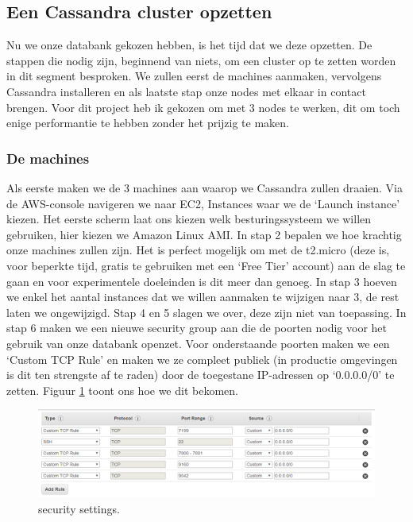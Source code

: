 \documentclass{article}
\begin{document}
	\subsection{Een Cassandra cluster opzetten}
	Nu we onze databank gekozen hebben, is het tijd dat we deze opzetten. 
	De stappen die nodig zijn, beginnend van niets, om een cluster op te zetten worden in dit segment besproken. 
	We zullen eerst de machines aanmaken, vervolgens Cassandra installeren en als laatste stap onze nodes met elkaar in contact brengen.
	Voor dit project heb ik gekozen om met 3 nodes te werken, dit om toch enige performantie te hebben zonder het prijzig te maken.
	\subsubsection{De machines}
	Als eerste maken we de 3 machines aan waarop we Cassandra zullen draaien. 
	Via de AWS-console navigeren we naar EC2, Instances waar we de ‘Launch instance’ kiezen.
	Het eerste scherm laat ons kiezen welk besturingssysteem we willen gebruiken, hier kiezen we Amazon Linux AMI. 
	In stap 2 bepalen we hoe krachtig onze machines zullen zijn. Het is perfect mogelijk om met de t2.micro 
	(deze is, voor beperkte tijd, gratis te gebruiken met een ‘Free Tier’ account) aan de slag te gaan en voor experimentele doeleinden is dit meer dan genoeg.
	In stap 3 hoeven we enkel het aantal instances dat we willen aanmaken te wijzigen naar 3, 
	de rest laten we ongewijzigd. Stap 4 en 5 slagen we over, deze zijn niet van toepassing. 
	In stap 6 maken we een nieuwe security group aan die de poorten nodig voor het gebruik van onze databank openzet. 
	Voor onderstaande poorten maken we een ‘Custom TCP Rule’ en maken we ze compleet publiek (in productie omgevingen is 
	dit ten strengste af te raden) door de toegestane IP-adressen op ‘0.0.0.0/0’ te zetten. 	Figuur \ref{fig:security-settings} toont ons hoe we dit bekomen.
	
	
	
	\begin{figure}[h!]
  		\includegraphics[width=\linewidth]{images/inbound-rules-cassandra.PNG}
  		\caption{security settings.}
  		\label{fig:security-settings}
	\end{figure}
	
\end{document}
